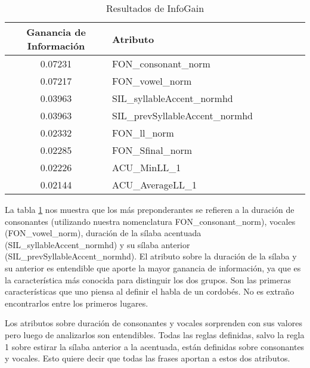 \begin{table}[H]
\centering
\begin{tabular}{|c|l|c|c|c|c|c|}
\hline
\textbf{Ganancia de Información} & \textbf{Atributo} \\ \hline
 0.07231     & FON\_consonant\_norm \\ \hline
 0.07217     & FON\_vowel\_norm \\ \hline
 0.03963     & SIL\_syllableAccent\_normhd \\ \hline
 0.03963     & SIL\_prevSyllableAccent\_normhd \\ \hline
 0.02332     & FON\_ll\_norm \\ \hline
 0.02285     & FON\_Sfinal\_norm \\ \hline
 0.02226     & ACU\_MinLL\_1 \\ \hline
 0.02144     & ACU\_AverageLL\_1 \\ \hline
\end{tabular}
\caption{Resultados de InfoGain}
\label{infogain-table}
\end{table}

La tabla \ref{infogain-table} nos muestra que los más preponderantes se refieren a la duración de consonantes (utilizando nuestra nomenclatura FON\_consonant\_norm), vocales (FON\_vowel\_norm), duración de la sílaba acentuada (SIL\_syllableAccent\_\-normhd) y su sílaba anterior (SIL\_prevSyllableAccent\_normhd). El atributo sobre la duración de la sílaba y su anterior es entendible que aporte la mayor ganancia de información, ya que es la característica más conocida para distinguir los dos grupos. Son las primeras características que uno piensa al definir el habla de un cordobés. No es extraño encontrarlos entre los primeros lugares. 

Los atributos sobre duración de consonantes y vocales sorprenden con sus valores pero luego de analizarlos son entendibles. Todas las reglas definidas, salvo la regla 1 sobre estirar la sílaba anterior a la acentuada, están definidas sobre consonantes y vocales. Esto quiere decir que todas las frases aportan a estos dos atributos.



